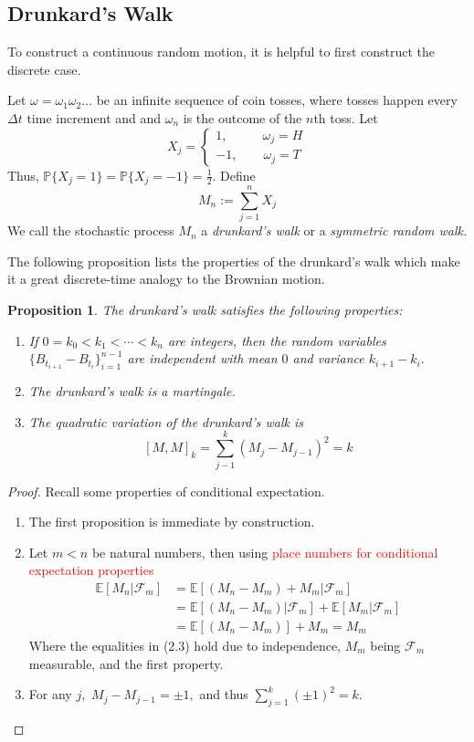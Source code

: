 \documentclass[openany, amssymb, psamsfonts]{amsart}
\newtheorem{prop}{Proposition}[section]
\theoremstyle{definition}
\numberwithin{equation}{section}
\newcommand{\bbE}{\mathbb{E}}
\newcommand{\bbP}{\mathbb{P}}
\begin{document}
\subsection{Drunkard's Walk} %

To construct a continuous random motion, it is helpful to first construct the discrete case.


Let $\omega = \omega_1\omega_2\dots$ be an infinite sequence of coin tosses, where tosses happen every $\Delta t$ time increment and and $\omega_n$ is the outcome of the $n$th toss. Let
\[X_j = \begin{cases}
1, \qquad \:\:\;\omega_j = H\\
-1, \qquad \omega_j = T
\end{cases}\]
Thus, $\bbP\{X_j = 1\} = \bbP\{X_j = -1\} = \frac{1}{2}.$ Define
\[M_n:= \sum_{j=1}^nX_j\] We call the stochastic process $M_n$ a \textit{drunkard's walk} or a \textit{symmetric random walk.}


The following proposition lists the properties of the drunkard's walk which make it a great discrete-time analogy to the Brownian motion.

\begin{prop}
The drunkard's walk satisfies the following properties:
\begin{enumerate}
\item If $0 = k_0 < k_1 < \cdots < k_n$ are integers, then the random variables $\{B_{t_{i+1}} - B_{t_i}\}_{i=1}^{n-1}$ are independent with mean $0$ and variance $k_{i+1} - k_i.$
\item The drunkard's walk is a martingale.
\item The quadratic variation of the drunkard's walk is 
\[[M,M]_k = \sum_{j-1}^k(M_j - M_{j-1})^2 = k\]
\end{enumerate}
\end{prop}

\begin{proof} Recall some properties of conditional expectation.
\begin{enumerate}
    \item The first proposition is immediate by construction.
    \item Let $m<n$ be natural numbers, then using \textcolor{red}{place numbers for conditional expectation properties}
        \begin{align}
            \bbE[M_n | \mathcal{F}_m] &= \bbE[(M_n - M_m) + M_m | \mathcal{F}_m] \nonumber\\
            &= \bbE[(M_n - M_m)| \mathcal{F}_m] + \bbE[M_m | \mathcal{F}_m]\nonumber\\
            &= \bbE[(M_n - M_m)] + M_m = M_m
        \end{align}
        Where the equalities in (2.3) hold due to independence, $M_m$ being $\mathcal{F}_m$ measurable, and the first property.
    \item For any $j,$ $M_j - M_{j-1} = \pm 1,$ and thus $\displaystyle\sum_{j=1}^k (\pm 1)^2 = k.$
\end{enumerate}
\end{proof}
\end{document}
